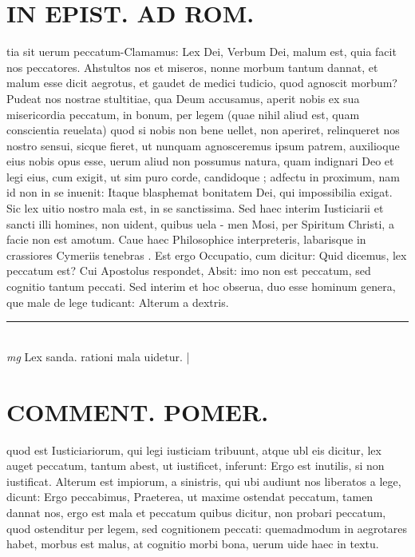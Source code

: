 \documentclass{article}
\begin{document}
\begin{pages}
\section*{IN EPIST. AD ROM.  }
\marginpar{[ p.72 ]}\pstart tia sit uerum peccatum-Clamamus: Lex Dei, Verbum Dei, malum est, quia facit nos peccatores. Ahstultos nos et miseros, nonne morbum tantum dannat, et malum esse dicit aegrotus, et gaudet de medici tudicio, quod agnoscit morbum? Pudeat nos nostrae stultitiae, qua Deum accusamus, aperit nobis ex sua misericordia peccatum, in bonum, per legem (quae nihil aliud est, quam conscientia reuelata) quod si nobis non bene uellet, non aperiret, relinqueret nos nostro sensui, sicque fieret, ut nunquam agnosceremus ipsum patrem, auxilioque eius nobis opus esse, uerum aliud non possumus natura, quam indignari Deo et legi eius, cum exigit, ut sim puro corde, candidoque ; adfectu in proximum, nam id non in se inuenit: Itaque blasphemat bonitatem Dei, qui impossibilia exigat. Sic lex uitio nostro mala est, in se sanctissima. Sed haec interim Iusticiarii et sancti illi homines, non uident, quibus uela - men Mosi, per Spiritum Christi, a facie non est amotum. Caue haec Philosophice interpreteris, labarisque in crassiores Cymeriis tenebras . Est ergo Occupatio, cum dicitur: Quid dicemus, lex peccatum est? Cui Apostolus respondet, Absit: imo non est peccatum, sed cognitio tantum peccati. Sed interim et hoc obserua, duo esse hominum genera, que male de lege tudicant: Alterum a dextris.  \pend
\vspace{0.5cm}\noindent
\vspace{0.2cm}\rule{1cm}{0.2pt}\\ 
\hspace{0.2cm}\textit{mg}
\footnotesize Lex sanda. rationi mala uidetur.  
\normalsize| 
\section*{COMMENT. POMER.  }\pstart quod est Iusticiariorum, qui legi iusticiam tribuunt, atque ubl eis dicitur, lex auget peccatum, tantum abest, ut iustificet, inferunt: Ergo est inutilis, si non iustificat. Alterum est impiorum, a sinistris, qui ubi audiunt nos liberatos a lege, dicunt: Ergo peccabimus, Praeterea, ut maxime ostendat peccatum, tamen dannat nos, ergo est mala et peccatum quibus dicitur, non probari peccatum, quod ostenditur per legem, sed cognitionem peccati: quemadmodum in aegrotares habet, morbus est malus, at cognitio morbi bona, uerum uide haec in textu.   \pend
{}
{}

\end{pages}
\end{document}

